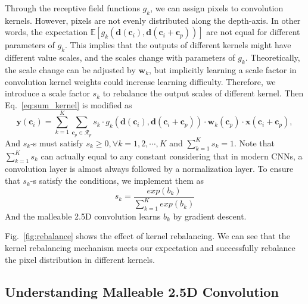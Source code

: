 \documentclass[runningheads]{llncs}
\begin{document}
Through the receptive field functions $g_k$, we can assign pixels to convolution kernels.
However, pixels are not evenly distributed along the depth-axis.
In other words, the expectation
 $\mathbb{E}[g_k(\mathbf{d}(\mathbf{c}_i), \mathbf{d}(\mathbf{c}_i+\mathbf{c}_p))]$
are not equal for different parameters of $g_k$.
This implies that the outputs of different kernels might have different value scales, and the scales change with parameters of $g_k$.
Theoretically, the scale change can be adjusted by $\mathbf{w}_k$, but implicitly learning a scale factor in convolution kernel weights could increase learning difficulty.
Therefore, we introduce a scale factor $s_k$ to rebalance the output scales of different kernel.
Then Eq.~\ref{eq:sum_kernel} is modified as
\begin{equation}
   \mathbf{y}(\mathbf{c}_i) =
   \sum_{k=1}^K
   \sum_{\mathbf{c}_p\in\mathcal{R}_p}
   s_k \cdot
   g_k(\mathbf{d}(\mathbf{c}_i), \mathbf{d}(\mathbf{c}_i+\mathbf{c}_p))
   \cdot
   \mathbf{w}_k(\mathbf{c}_p)
   \cdot
   \mathbf{x}(\mathbf{c}_i+\mathbf{c}_p),
\end{equation}
And $s_k$-s must satisfy
$s_k \geq 0, \forall k=1,2,\cdots,K$
and
$\sum_{k=1}^K s_k = 1$.
Note that $\sum_{k=1}^K s_k$ can actually equal to any constant considering that in modern CNNs, a convolution layer is almost always followed by a normalization layer.
To ensure that $s_k$-s satisfy the conditions, we implement them as
\begin{equation}
  s_k = \frac{exp(b_k)}{\sum_{k=1}^K exp(b_k)}
\end{equation}
And the malleable 2.5D convolution learns $b_k$ by gradient descent.

Fig.~\ref{fig:rebalance} shows the effect of kernel rebalancing.
We can see that the kernel rebalancing mechanism meets our expectation and successfully rebalance the pixel distribution in different kernels.

\subsection{Understanding Malleable 2.5D Convolution}
\end{document}
